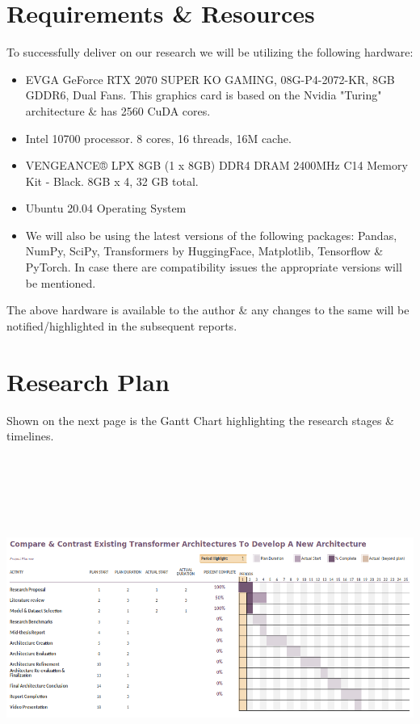\documentclass[11pt]{article}
\begin{document}
\section{Requirements \& Resources}\label{resources}

To successfully deliver on our research we will be utilizing the following hardware:
\begin{itemize}
    \item EVGA GeForce RTX 2070 SUPER KO GAMING, 08G-P4-2072-KR, 8GB GDDR6, Dual Fans\citep{evga}. This graphics card is based on the Nvidia "Turing" architecture \& has 2560 CuDA cores.
    \item Intel 10700 processor. 8 cores, 16 threads, 16M cache\citep{intel}.
    \item VENGEANCE® LPX 8GB (1 x 8GB) DDR4 DRAM 2400MHz C14 Memory Kit - Black\citep{Ram}. 8GB x 4, 32 GB total.
    \item Ubuntu 20.04 Operating System
    \item We will also be using the latest versions of the following packages: Pandas, NumPy, SciPy, Transformers by HuggingFace, Matplotlib, Tensorflow \& PyTorch. In case there are compatibility issues the appropriate versions will be mentioned.
\end{itemize}


The above hardware is available to the author \& any changes to the same will be notified/highlighted in the subsequent reports.
\section{Research Plan}\label{plan}

Shown on the next page is the Gantt Chart highlighting the research stages \& timelines.\\
\includegraphics[width=180mm,height=120mm,angle=90]{g2.png}
\newpage

\end{document}
